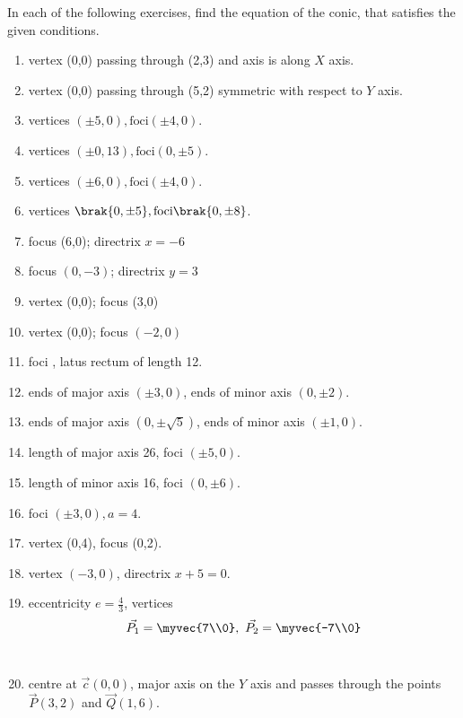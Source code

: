 In each of the following exercises, find the equation of the conic, that satisfies the given conditions.

\begin{enumerate}[label=\thesubsection.\arabic*,ref=\thesubsection.\theenumi,resume*]
\item vertex (0,0) passing through (2,3) and axis is along $X$ axis.
\item vertex (0,0) passing through (5,2) symmetric with respect to $Y$ axis.
\item vertices $(\pm5,0),\text{foci} (\pm4,0)$.
\item vertices $(\pm0,13),\text{foci} (0,\pm5)$.
\item vertices $(\pm6,0),\text{foci} (\pm4,0)$.
\item vertices $\brak{0,\pm 5}, \text{foci} \brak{0,\pm 8}$.  
\item focus (6,0); directrix $x=-6$
\item focus $(0,-3)$; directrix $y=3$
\item vertex (0,0); focus (3,0)
\item vertex (0,0); focus $(-2,0) $
\item  foci , latus rectum of length 12.
\\
\solution
		
\item ends of major axis $(\pm3,0)$, ends of minor axis $(0,\pm2)$.
\item ends of major axis $(0,\pm \sqrt{5})$, ends of minor axis $(\pm1,0)$.
\item length of major axis 26, foci $(\pm5,0)$.
\item length of minor axis 16, foci $(0,\pm6)$.
\item foci $(\pm3,0), a=4$.
\item vertex (0,4),  focus (0,2). 
\item vertex $(-3,0)$,  directrix $x+5=0$.
    \item eccentricity $e = \frac{4}{3}$,
    vertices 
    \begin{align}
        \vec{P_1} = \myvec{7\\0},\ \vec{P_2} = \myvec{-7\\0}
        \label{eq:chapters/11/11/4/14/vert}
    \end{align}
\\
\solution
		
\item centre at $\vec{c}(0,0)$, major axis on the $Y$ axis and passes through the points $\vec{P}(3,2)$ and $\vec{Q}(1,6)$.

\end{enumerate}

